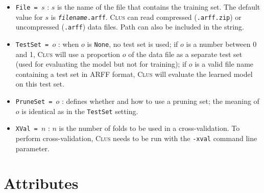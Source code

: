 \documentclass[a4paper]{report}
\newcommand{\clus}{\textsc{Clus}}
\begin{document}
\begin{itemize}
\item {\tt File = $s$} : $s$ is the name of the file that contains the training set.  The default value for $s$ is {\tt {\em filename}.arff}.  \clus{} can read compressed ({\tt .arff.zip}) or uncompressed ({\tt .arff}) data files. Path can also be included in the string.
\item {\tt TestSet = $o$} : when $o$ is {\tt None}, no test set is used; if $o$ is a number between 0 and 1, \clus{} will use a proportion $o$ of the data file as a separate test set (used for evaluating the model but not for training); if $o$ is a valid file name containing a test set in ARFF format, \clus{} will evaluate the learned model on this test set.
\item {\tt PruneSet = $o$} : defines whether and how to use a pruning set; the meaning of $o$ is identical as in the {\tt TestSet} setting.
\item {\tt XVal = $n$}\label{sett:xval} : $n$ is the number of folds to be used in a cross-validation.  To perform cross-validation, \clus{} needs to be run with the {\tt -xval} command line parameter.
\end{itemize}

\section{Attributes}
\end{document}
